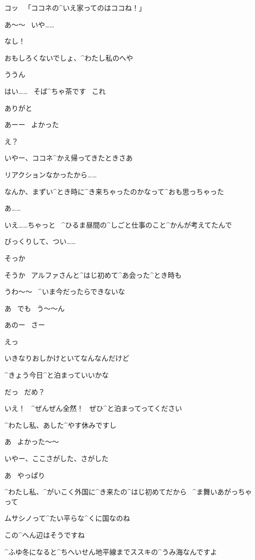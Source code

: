 \Alpha コッ
\ 「ココネの^{いえ}{家}ってのはココね！」

\Alpha あ〜〜
\ いや……

\Alpha なし！

\page
\Kokone おもしろくないでしょ、^{わたし}{私}のへや

\Alpha ううん

\Kokone はい……
\ そば^{ちゃ}{茶}です
\ これ

\Alpha ありがと

\page
\Alpha あーー
\ よかった

\Kokone え？

\Alpha いやー、ココネ^{かえ}{帰}ってきたときさあ

\Alpha リアクションなかったから……

\Alpha なんか、まずい^{とき}{時}に^{き}{来}ちゃったのかなって^{おも}{思}っちゃった

\Kokone あ……

\Kokone いえ……ちゃっと
\ ^{ひるま}{昼間}の^{しごと}{仕事}のこと^{かんが}{考}えてたんで

\Kokone びっくりして、つい……

\Alpha そっか

\page
\Kokone そうか
\ アルファさんと^{はじ}{初}めて^{あ}{会}った^{とき}{時}も

\Kokone うわ〜〜
\ ^{いま}{今}だったらできないな

\Kokone あ
\ でも
\ う〜〜ん

\page
\Alpha あのー
\ さー

\Kokone えっ

\Alpha いきなりおしかけといてなんなんだけど

\Alpha ^{きょう}{今日}^{と}{泊}まっていいかな

\Alpha だっ
\ だめ？

\Kokone いえ！
\ ^{ぜんぜん}{全然}！
\ ぜひ^{と}{泊}まってってください

\Kokone ^{わたし}{私}、あした^{やす}{休}みですし

\Alpha あ
\ よかった〜〜

\page
\Alpha いやー、ここさがした、さがした

\Kokone あ
\ やっぱり

\Alpha ^{わたし}{私}、^{がいこく}{外国}に^{き}{来}たの^{はじ}{初}めてだから
\ ^{ま}{舞}いあがっちゃって

\Alpha ムサシノって^{たい}{平}らな^{くに}{国}なのね

\Kokone この^{へん}{辺}はそうですね

\Kokone ^{ふゆ}{冬}になると^{ちへいせん}{地平線}までススキの^{うみ}{海}なんですよ

